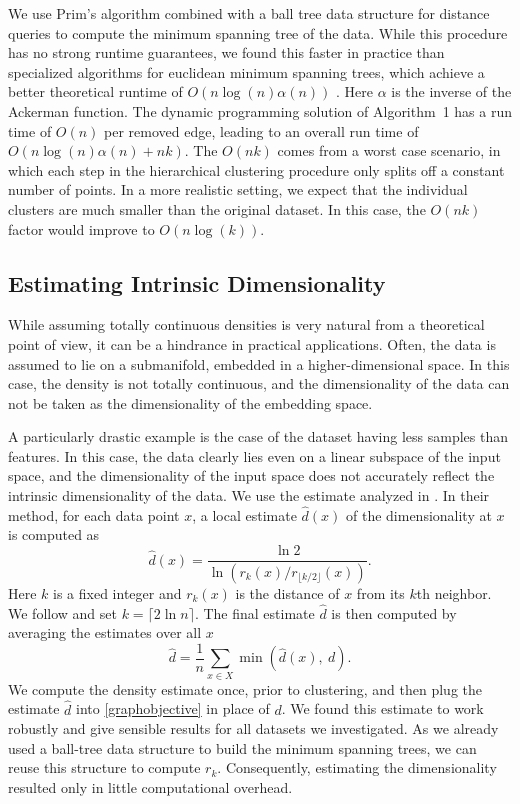 We use Prim's algorithm combined with a ball tree data structure for distance
queries to compute the minimum spanning tree of the data.
While this procedure has no strong runtime guarantees, we found this faster
in practice than specialized algorithms for euclidean minimum spanning trees, 
which achieve a better theoretical runtime of $O(n \log(n) \alpha(n))$ \citep{dtb2010}. Here
$\alpha$ is the inverse of the Ackerman function. The dynamic programming solution of
Algorithm~1 has a run time of $O(n)$ per removed edge, leading to an overall
run time of $O(n \log(n) \alpha(n)+ nk)$. The $O(nk)$ comes from a worst case
scenario, in which each step in the hierarchical clustering procedure only
splits off a constant number of points. In a more realistic setting, we expect
that the individual clusters are much smaller than the original dataset. In
this case, the $O(nk)$ factor would improve to $O(n\log(k))$.

\subsection{Estimating Intrinsic Dimensionality}
While assuming totally continuous densities is very natural from a theoretical
point of view, it can be a hindrance in practical applications.  Often, the
data is assumed to lie on a submanifold, embedded in a
higher-dimensional space. In this case, the density is not totally continuous,
and the dimensionality of the data can not be taken as the dimensionality of
the embedding space.

A particularly drastic example is the case of the dataset having less samples
than features. In this case, the data clearly lies even on a linear subspace
of the input space, and the dimensionality of the input space does not
accurately reflect the intrinsic dimensionality of the data.
We use the estimate analyzed in \citet{massoud2007manifold}.
In their method, for each data point $x$, a local estimate $\hat{d}(x)$ of the
dimensionality at $x$ is computed as
\begin{equation}
    \hat{d}(x) = \frac{\ln 2}{\ln\left(r_k(x) / r_{\lfloor k /2 \rfloor}(x)\right)}.
\end{equation}
Here $k$ is a fixed integer and $r_k(x)$ is the distance of $x$ from its $k$th neighbor.
We follow \citet{massoud2007manifold} and set $k =\lceil 2 \ln n\rceil$.
The final estimate $\hat{d}$ is then computed by averaging the estimates over all $x$
\begin{equation}
    \hat{d} = \frac{1}{n}\sum_{x \in X} \min\left(\hat{d}(x),\ d\right).
\end{equation}
We compute the density estimate once, prior to clustering, and then plug the
estimate $\hat{d}$ into \eqref{graphobjective} in place of $d$.
We found this estimate to work robustly and give sensible results for all
datasets we investigated. As we already used a ball-tree data structure to
build the minimum spanning trees, we can reuse this structure to compute $r_k$.
Consequently, estimating the dimensionality resulted only in little
computational overhead.

